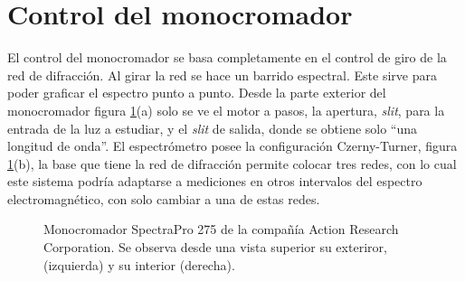 \section{Control del monocromador}
El control del monocromador se basa completamente en el control de giro de la red de difracción. Al girar la red se hace un barrido espectral. Este sirve para poder graficar el espectro punto a punto. Desde la parte exterior del monocromador figura \ref{fig:spectrapro}(a) solo se ve el motor a pasos, la apertura, \textit{slit}, para la entrada de la luz a estudiar, y el \textit{slit} de salida, donde se obtiene solo ``una longitud de onda''. El espectrómetro posee la configuración Czerny-Turner, figura \ref{fig:spectrapro}(b), la base que tiene la red de difracción permite colocar tres redes, con lo cual este sistema podría adaptarse a mediciones en otros intervalos del espectro electromagnético, con solo cambiar a una de estas redes. 
\begin{figure}[h]
	\centering
	\caption{Monocromador SpectraPro 275 de la compañía Action Research Corporation. Se observa desde una vista superior su exteriror, (izquierda) y su interior (derecha).}
	\label{fig:spectrapro}
\end{figure}

